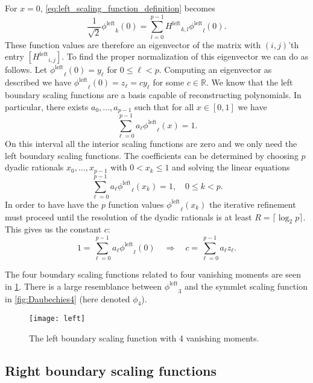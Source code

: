 \documentclass[a4paper]{scrartcl}
\newcommand\lphi{\ensuremath{\phi^{\text{left}}}}
\newcommand\lH{\ensuremath{H^{\text{left}}}}
\newcommand\R{\ensuremath{\mathbb{R}}}
\begin{document}
For $x = 0$, \eqref{eq:left_scaling_function_definition} becomes
\begin{equation*}
	\frac1{\sqrt2} \lphi_k(0)
    = \sum_{l=0}^{p-1} \lH_{k,l} \lphi_l(0).
\end{equation*}
These function values are therefore an eigenvector of the matrix with $(i,j)$'th entry $[\lH_{i,j}]$.
To find the proper normalization of this eigenvector we can do as follows.
Let $\lphi_\ell(0) = y_\ell$ for $0\leq \ell < p$.
Computing an eigenvector as described we have $\lphi_\ell(0) = z_\ell = c y_\ell$ for some $c \in \R$.
We know that the left boundary scaling functions are a basis capable of reconstructing polynomials.
In particular, there exists $a_0, \ldots, a_{p-1}$ such that for all $x \in [0, 1]$ we have
\begin{equation*}
    \sum_{\ell=0}^{p-1} a_\ell \lphi_\ell(x) = 1.
\end{equation*}
On this interval all the interior scaling functions are zero and we only need the left boundary scaling functions.
The coefficients can be determined by choosing $p$ dyadic rationals $x_0, \ldots, x_{p-1}$ with $0 < x_k \leq 1$ and solving the linear equations
\begin{equation*}
    \sum_{\ell=0}^{p-1} a_\ell \lphi_\ell(x_k) = 1, \quad 0\leq k< p.
\end{equation*}
In order to have have the $p$ function values $\lphi_\ell(x_k)$ the iterative refinement must proceed until the resolution of the dyadic rationals is at least $R = \lceil \log_2 p \rceil$.
This gives us the constant $c$:
\begin{equation*}
    1 = \sum_{\ell=0}^{p-1} a_\ell \lphi_\ell(0) 
    \quad\Rightarrow\quad
    c = \sum_{\ell=0}^{p-1} a_\ell z_\ell. 
\end{equation*}


The four boundary scaling functions related to four vanishing moments are seen in \cref{fig:left_Daubechies4}.
There is a large resemblance between $\lphi_3$ and the symmlet scaling function in \cref{fig:Daubechies4} (here denoted $\phi_4$).

\begin{figure}
	\centering
	\texttt{[image: left]}
	\caption{The left boundary scaling function with 4 vanishing moments.}
	\label{fig:left_Daubechies4}
\end{figure}


\subsection{Right boundary scaling functions}
\end{document}

